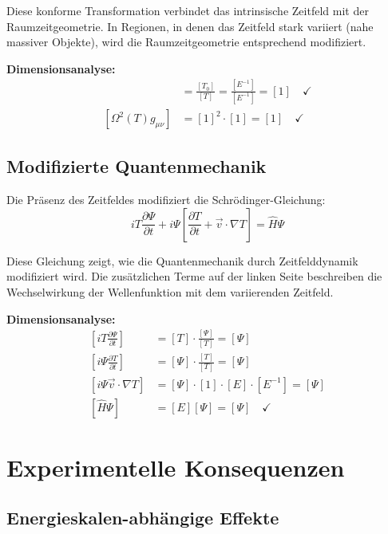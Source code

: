 \documentclass[12pt,a4paper]{report}
\begin{document}
	Diese konforme Transformation verbindet das intrinsische Zeitfeld mit der Raumzeitgeometrie. In Regionen, in denen das Zeitfeld stark variiert (nahe massiver Objekte), wird die Raumzeitgeometrie entsprechend modifiziert.
	
	\textbf{Dimensionsanalyse:}
	\begin{align}
		[\Omega(T)] &= \frac{[T_0]}{[T]} = \frac{[E^{-1}]}{[E^{-1}]} = [1] \quad \checkmark \\
		[\Omega^2(T) g_{\mu\nu}] &= [1]^2 \cdot [1] = [1] \quad \checkmark
	\end{align}
	
	\subsection{Modifizierte Quantenmechanik}\label{subsec:modified_quantum_mechanics}
	
	Die Präsenz des Zeitfeldes modifiziert die Schrödinger-Gleichung:
	\begin{equation}
		i T \frac{\partial\Psi}{\partial t} + i\Psi\left[\frac{\partial T}{\partial t} + \vec{v} \cdot \nabla T\right] = \hat{H}\Psi
		\label{eq:modified_schrodinger}
	\end{equation}
	
	Diese Gleichung zeigt, wie die Quantenmechanik durch Zeitfelddynamik modifiziert wird. Die zusätzlichen Terme auf der linken Seite beschreiben die Wechselwirkung der Wellenfunktion mit dem variierenden Zeitfeld.
	
	\textbf{Dimensionsanalyse:}
	\begin{align}
		\left[i T \frac{\partial\Psi}{\partial t}\right] &= [T] \cdot \frac{[\Psi]}{[T]} = [\Psi] \\
		\left[i\Psi\frac{\partial T}{\partial t}\right] &= [\Psi] \cdot \frac{[T]}{[T]} = [\Psi] \\
		\left[i\Psi\vec{v} \cdot \nabla T\right] &= [\Psi] \cdot [1] \cdot [E] \cdot [E^{-1}] = [\Psi] \\
		[\hat{H}\Psi] &= [E][\Psi] = [\Psi] \quad \checkmark
	\end{align}
	
	\section{Experimentelle Konsequenzen}\label{sec:experimental_consequences}
	
	\subsection{Energieskalen-abhängige Effekte}\label{subsec:energy_scale_effects}
	
\end{document}
